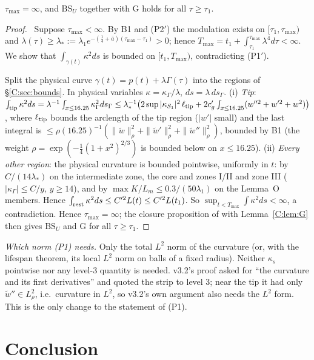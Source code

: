 \documentclass[11pt]{article}
\begin{document}
\begin{proposition}\label{C:prop:global}
$\tau_{\max}=\infty$, and $\mathrm{BS}_U$ together with $\mathrm{G}$ holds for all $\tau\ge\tau_1$.
\end{proposition}
\begin{proof}\tP\ Suppose $\tau_{\max}<\infty$. By B1 and (P2$'$) the modulation exists on $[\tau_1,\tau_{\max})$ and $\lambda(\tau)\ge\lambda_*:=\lambda_1e^{-(\frac14+\bar a)(\tau_{\max}-\tau_1)}>0$; hence $T_{\max}=t_1+\int_{\tau_1}^{\tau_{\max}}\lambda^4d\tau<\infty$. We show that $\int_{\gamma(t)}\kappa^2ds$ is bounded on $[t_1,T_{\max})$, contradicting (P1$'$).

Split the physical curve $\gamma(t)=p(t)+\lambda\Gamma(\tau)$ into the regions of \S\ref{C:sec:bounds}. In physical variables $\kappa=\kappa_\Gamma/\lambda$, $ds=\lambda\,ds_\Gamma$.
(i) \emph{Tip}: $\int_{\rm tip}\kappa^2ds=\lambda^{-1}\int_{x\le16.25}\kappa_\Gamma^2ds_\Gamma\le\lambda_*^{-1}\bigl(2\sup|\kappa_{S_1}|^2\,\ell_{\rm tip}+2c_g'\int_{x\le16.25}(w''^2+w'^2+w^2)\bigr)$, where $\ell_{\rm tip}$ bounds the arclength of the tip region ($|w'|$ small) and the last integral is $\le\rho(16.25)^{-1}(\|\tilde w\|_\rho^2+\|\tilde w'\|_\rho^2+\|\tilde w''\|_\rho^2)$, bounded by B1 (the weight $\rho=\exp(-\frac14(1+x^2)^{2/3})$ is bounded below on $x\le16.25$).
(ii) \emph{Every other region}: the physical curvature is bounded pointwise, uniformly in $t$: by $C/(14\lambda_*)$ on the intermediate zone, the core and zones I/II and zone III ($|\kappa_\Gamma|\le C/y$, $y\ge14$), and by $\max K/L_m\le0.3/(50\lambda_1)$ on the Lemma~O members. Hence $\int_{\rm rest}\kappa^2ds\le C'^2L(t)\le C'^2L(t_1)$.
So $\sup_{t<T_{\max}}\int\kappa^2ds<\infty$, a contradiction. Hence $\tau_{\max}=\infty$; the closure proposition of  with Lemma~\ref{C:lem:G} then gives $\mathrm{BS}_U$ and G for all $\tau\ge\tau_1$.
\end{proof}
\noindent\emph{Which norm (P1) needs.} Only the total $L^2$ norm of the curvature (or, with the lifespan theorem, its local $L^2$ norm on balls of a fixed radius). Neither $\kappa_s$ pointwise nor any level-3 quantity is needed. v3.2's proof asked for ``the curvature and its first derivatives'' and quoted the strip to level 3; near the tip it had only $\tilde w''\in L^2_\rho$, i.e.\ curvature in $L^2$, so v3.2's own argument also needs the $L^2$ form. This is the only change to the statement of (P1).

\section{Conclusion}\label{C:sec:concl}
\end{document}

